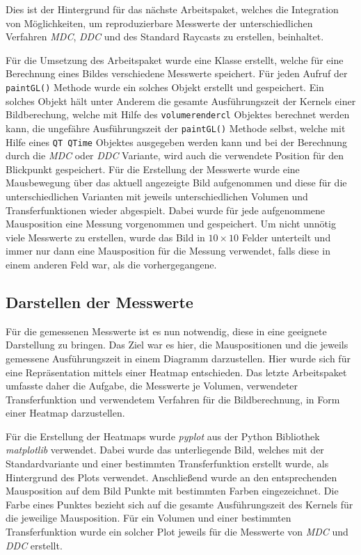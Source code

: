 Dies ist der Hintergrund für das nächste Arbeitspaket, welches die Integration von Möglichkeiten, um reproduzierbare Messwerte der unterschiedlichen Verfahren \emph{MDC}, \emph{DDC} und des Standard Raycasts zu erstellen, beinhaltet.

Für die Umsetzung des Arbeitspaket wurde eine Klasse erstellt, welche für eine Berechnung eines Bildes verschiedene Messwerte speichert.
Für jeden Aufruf der \texttt{paintGL()} Methode wurde ein solches Objekt erstellt und gespeichert.
Ein solches Objekt hält unter Anderem die gesamte Ausführungszeit der Kernels einer Bildberechung, welche mit Hilfe des \texttt{volumerendercl} Objektes berechnet werden kann, die ungefähre Ausführungszeit der \texttt{paintGL()} Methode selbst, welche mit Hilfe eines \texttt{QT QTime} Objektes ausgegeben werden kann und bei der Berechnung durch die \emph{MDC} oder \emph{DDC} Variante, wird auch die verwendete Position für den Blickpunkt gespeichert.
Für die Erstellung der Messwerte wurde eine Mausbewegung über das aktuell angezeigte Bild aufgenommen und diese für die unterschiedlichen Varianten mit jeweils unterschiedlichen Volumen und Transferfunktionen wieder abgespielt.
Dabei wurde für jede aufgenommene Mausposition eine Messung vorgenommen und gespeichert.
Um nicht unnötig viele Messwerte zu erstellen, wurde das Bild in $10\times10$ Felder unterteilt und immer nur dann eine Mausposition für die Messung verwendet, falls diese in einem anderen Feld war, als die vorhergegangene.

\subsection{Darstellen der Messwerte}
Für die gemessenen Messwerte ist es nun notwendig, diese in eine geeignete Darstellung zu bringen.
Das Ziel war es hier, die Mauspositionen und die jeweils gemessene Ausführungszeit in einem Diagramm darzustellen.
Hier wurde sich für eine Repräsentation mittels einer Heatmap entschieden.
Das letzte Arbeitspaket umfasste daher die Aufgabe, die Messwerte je Volumen, verwendeter Transferfunktion und verwendetem Verfahren für die Bildberechnung, in Form einer Heatmap darzustellen.

Für die Erstellung der Heatmaps wurde \emph{pyplot} aus der Python Bibliothek \emph{matplotlib} verwendet.
Dabei wurde das unterliegende Bild, welches mit der Standardvariante und einer bestimmten Transferfunktion erstellt wurde, als Hintergrund des Plots verwendet.
Anschließend wurde an den entsprechenden Mausposition auf dem Bild Punkte mit bestimmten Farben eingezeichnet.
Die Farbe eines Punktes bezieht sich auf die gesamte Ausführungszeit des Kernels für die jeweilige Mausposition.
Für ein Volumen und einer bestimmten Transferfunktion wurde ein solcher Plot jeweils für die Messwerte von \emph{MDC} und \emph{DDC} erstellt.
